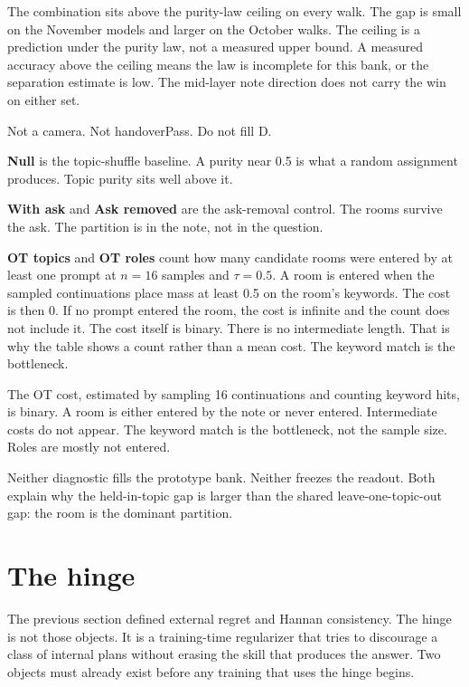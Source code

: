 \documentclass[11pt,a4paper]{article}
\begin{document}
The combination sits above the purity-law ceiling on every walk. The gap
is small on the November models and larger on the October walks. The
ceiling is a prediction under the purity law, not a measured upper
bound. A measured accuracy above the ceiling means the law is incomplete
for this bank, or the separation estimate is low. The mid-layer note
direction does not carry the win on either set.

Not a camera. Not handoverPass. Do not fill D.

\textbf{Null} is the topic-shuffle baseline. A purity near 0.5 is what a
random assignment produces. Topic purity sits well above it.

\textbf{With ask} and \textbf{Ask removed} are the ask-removal control.
The rooms survive the ask. The partition is in the note, not in the
question.

\textbf{OT topics} and \textbf{OT roles} count how many candidate rooms
were entered by at least one prompt at \(n = 16\) samples and
\(\tau = 0.5\). A room is entered when the sampled continuations place
mass at least 0.5 on the room's keywords. The cost is then 0. If no
prompt entered the room, the cost is infinite and the count does not
include it. The cost itself is binary. There is no intermediate length.
That is why the table shows a count rather than a mean cost. The keyword
match is the bottleneck.

The OT cost, estimated by sampling 16 continuations and counting keyword
hits, is binary. A room is either entered by the note or never entered.
Intermediate costs do not appear. The keyword match is the bottleneck,
not the sample size. Roles are mostly not entered.

Neither diagnostic fills the prototype bank. Neither freezes the
readout. Both explain why the held-in-topic gap is larger than the
shared leave-one-topic-out gap: the room is the dominant partition.

\section{The hinge}

The previous section defined external regret and Hannan consistency. The
hinge is not those objects. It is a training-time regularizer that tries
to discourage a class of internal plans without erasing the skill that
produces the answer. Two objects must already exist before any training
that uses the hinge begins.
\end{document}
